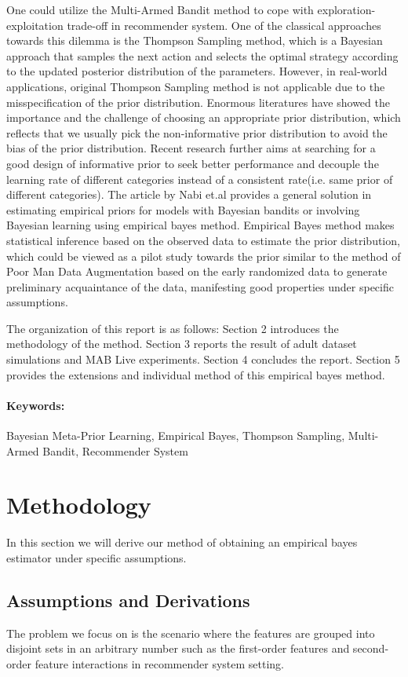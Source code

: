 \documentclass{article}
\begin{document}
One could utilize the Multi-Armed Bandit method to cope with exploration-exploitation trade-off in recommender system. One of the classical approaches towards this dilemma is the Thompson Sampling method, which is a Bayesian approach that samples the next action and selects the optimal strategy according to the updated posterior distribution of the parameters. However, in real-world applications, original Thompson Sampling method is not applicable due to the misspecification of the prior distribution. Enormous literatures have showed the importance and the challenge of choosing an appropriate prior distribution, which reflects that we usually pick the non-informative prior distribution to avoid the bias of the prior distribution. Recent research further aims at searching for a good design of informative prior to seek better performance and decouple the learning rate of different categories instead of a consistent rate(i.e. same prior of different categories). The article by Nabi et.al provides a general solution in estimating empirical priors for models  with Bayesian bandits or involving Bayesian learning using empirical bayes method. Empirical Bayes method makes statistical inference based on the observed data to estimate the prior distribution, which could be viewed as a pilot study towards the prior similar to the method of Poor Man Data Augmentation based on the early randomized data to generate preliminary acquaintance of the data, manifesting good properties under specific assumptions.

The organization of this report is as follows: Section 2 introduces the methodology of the method. Section 3 reports the result of adult dataset simulations and MAB Live experiments. Section 4 concludes the report. Section 5 provides the extensions and individual method of this empirical bayes method.

\paragraph*{Keywords:} Bayesian Meta-Prior Learning, Empirical Bayes, Thompson Sampling, Multi-Armed Bandit, Recommender System

\section{Methodology}
In this section we will derive our method of obtaining an empirical bayes estimator under specific assumptions.
\subsection{Assumptions and Derivations}
The problem we focus on is the scenario where the features are grouped into disjoint sets in an arbitrary number such as the first-order features and second-order feature interactions in recommender system setting.
\end{document}
